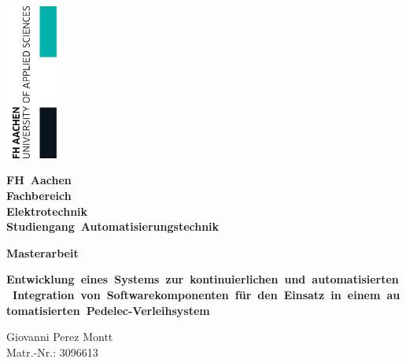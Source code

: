 \begin{titlepage}

	\thispagestyle{empty}

	\begin{flushright}
		\includegraphics[width=1.7cm]{./pic/FHAC.jpg}
	\end{flushright}

	\vspace{-2.5cm}

	\centering \bfseries \Large FH~Aachen \\
	\vspace{0.5cm}
	\normalsize Fachbereich\\
	Elektrotechnik \\
	Studiengang~Automatisierungstechnik

	\vspace{1cm}

	\centering \bfseries Masterarbeit

	\vspace{0.8cm}

	\centering \begin{minipage}[t]{17cm}
		\centering \bfseries \large Entwicklung~eines~Systems~zur~kontinuierlichen~und~automatisierten~Integration~von~Softwarekomponenten~für~den~Einsatz~in~einem~automatisierten~Pedelec-Verleihsystem\\
		\medskip
	\end{minipage}

	\vspace{1.5cm}

	\begin{minipage}[t]{9cm}
		\centering Giovanni Perez Montt \\ Matr.-Nr.: 3096613
	\end{minipage}


\end{titlepage}
